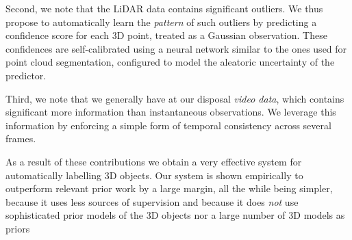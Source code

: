 Second, we note that the LiDAR data contains significant outliers.
We thus propose to automatically learn the \emph{pattern} of such outliers by predicting a confidence score for each 3D point, treated as a Gaussian observation.
These confidences are self-calibrated using a neural network similar to the ones used for point cloud segmentation, configured to model the aleatoric uncertainty of the predictor.

Third, we note that we generally have at our disposal \emph{video data}, which contains significant more information than instantaneous observations.
We leverage this information by enforcing a simple form of temporal consistency across several frames.

As a result of these contributions we obtain a very effective system for automatically labelling 3D objects.
Our system is shown empirically to outperform relevant prior work by a large margin, all the while being simpler, because it uses less sources of supervision and because it does \emph{not} use sophisticated prior models of the 3D objects nor a large number of 3D models as priors~\cite{sdflabel,qin20weakly}



